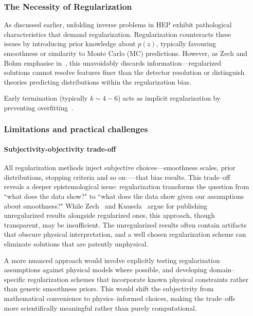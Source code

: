         \subsubsection{The Necessity of Regularization}  
         As discussed earlier, unfolding inverse problems in HEP exhibit pathological characteristics that demand regularization.
        Regularization counteracts these issues by introducing prior knowledge about \(p(z)\), typically favouring smoothness or similarity to Monte Carlo (MC) predictions.
        However, as Zech and Bohm emphasise in~\cite{Bohm2025IntroductionPhysicists}, this unavoidably discards information---regularized solutions cannot resolve features finer than the detector resolution or distinguish theories predicting distributions within the regularization bias.
        
        Early termination (typically \(k \sim 4-6\)) acts as implicit regularization by preventing overfitting~\cite{multhei_iterative_1987}.

    \subsubsection{Limitations and practical challenges}  
        \paragraph{Subjectivity-objectivity trade-off}  
            All regularization methods inject subjective choices---smoothness scales, prior distributions, stopping criteria and so on—--that bias results.
            This trade--off reveals a deeper epistemological issue: regularization transforms the question from ``what does the data show?" to ``what does the data show given our assumptions about smoothness?"
            While Zech~\cite{zech_regularization_2011} and Kuusela~\cite{kuusela_uncertainty_2016} argue for publishing unregularized results alongside regularized ones, this approach, though transparent, may be insufficient.
            The unregularized results often contain artifacts that obscure physical interpretation, and a well chosen regularization scheme can eliminate solutions that are patently unphysical.
            
            A more nuanced approach would involve explicitly testing regularization assumptions against physical models where possible, and developing domain--specific regularization schemes that incorporate known physical constraints rather than generic smoothness priors.
            This would shift the subjectivity from mathematical convenience to physics--informed choices, making the trade--offs more scientifically meaningful rather than purely computational.


